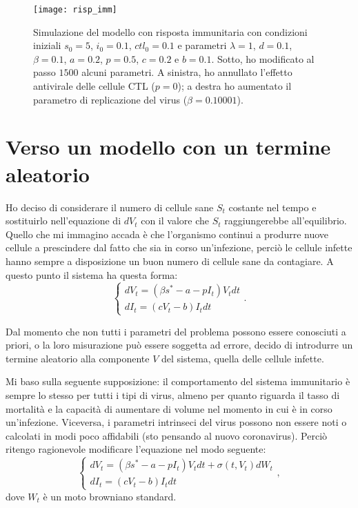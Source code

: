 \documentclass[12pt,a4paper,oneside]{amsart}
\theoremstyle{definition}
\begin{document}
\begin{figure}
\caption{Simulazione del modello con risposta immunitaria con condizioni iniziali $s_0=5$, $i_0=0.1$, $ctl_0=0.1$ e parametri $\lambda=1$, $d=0.1$, $\beta=0.1$, $a=0.2$, $p=0.5$, $c=0.2$ e $b=0.1$. Sotto, ho modificato al passo $1500$ alcuni parametri. A sinistra, ho annullato l'effetto antivirale delle cellule CTL ($p=0$); a destra ho aumentato il parametro di replicazione del virus ($\beta=0.10001$).}
\texttt{[image: risp\_imm]}
\label{fig_1}
\end{figure}

\section{Verso un modello con un termine aleatorio}
Ho deciso di considerare il numero di cellule sane $S_t$ costante nel tempo e sostituirlo nell'equazione di $dV_t$ con il valore che $S_t$ raggiungerebbe all'equilibrio. Quello che mi immagino accada è che l'organismo continui a produrre nuove cellule a prescindere dal fatto che sia in corso un'infezione, perciò le cellule infette hanno sempre a disposizione un buon numero di cellule sane da contagiare. A questo punto il sistema ha questa forma: \begin{equation}
\begin{cases}
dV_t=\left(\beta s^* -a -pI_t\right)V_tdt\\
dI_t=\left(cV_t-b\right)I_tdt
\end{cases}.
\end{equation}

Dal momento che non tutti i parametri del problema possono essere conosciuti a priori, o la loro misurazione può essere soggetta ad errore, decido di introdurre un termine aleatorio alla componente $V$ del sistema, quella delle cellule infette. 

Mi baso sulla seguente supposizione: il comportamento del sistema immunitario è sempre lo stesso per tutti i tipi di virus, almeno per quanto riguarda il tasso di mortalità e la capacità di aumentare di volume nel momento in cui è in corso un'infezione. Viceversa, i parametri intrinseci del virus possono non essere noti o calcolati in modi poco affidabili (sto pensando al nuovo coronavirus). Perciò ritengo ragionevole modificare l'equazione nel modo seguente: \begin{equation}
\begin{cases}
dV_t=\left(\beta s^* -a -pI_t\right)V_tdt + \sigma(t,V_t)dW_t\\
dI_t=\left(cV_t-b\right)I_tdt
\end{cases},
\end{equation}
dove $W_t$ è un moto browniano standard.
\end{document}
